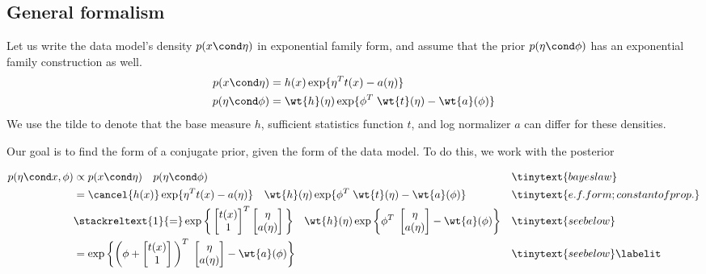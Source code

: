 \documentclass{article} %
\begin{document}
\subsection{General formalism} \label{sec:ef_general_formalism}

Let us write the data model's density $p(x \cond \eta)$ in exponential family form, and assume that the prior $p(\eta \cond \phi)$ has an exponential family construction as well.  
\begin{align*}
p(x \cond \eta) &= h(x) \exp \{\eta^T t(x) - a(\eta)   \}	 \\
p(\eta \cond \phi) &= \wt{h}(\eta) \exp \{\phi^T \; \wt{t}(\eta) - \wt{a}(\phi)   \}	
\end{align*}
We use the tilde to denote that the base measure $h$, sufficient statistics function $t$, and log normalizer $a$ can differ for these densities.  

Our goal is to find the form of a conjugate prior, given the form of the data model.    To do this, we work with the posterior 

\begin{align*}
p(\eta \cond x, \phi) & \propto p(x \cond \eta) \quad p(\eta \cond \phi) && \tinytext{bayes law}  \\
&=  \cancel{h(x)} \exp \{\eta^T t(x) - a(\eta)  \}  \quad \wt{h}(\eta) \exp \{\phi^T \; \wt{t}(\eta) - \wt{a}(\phi)   \}	&& \tinytext{e.f. form; constant of prop.}\\
& \stackreltext{1}{=} \exp \bigg\{
\begin{bmatrix} 
t(x) \\
1 \\
\end{bmatrix}^T
\begin{bmatrix} 
\eta \\
a(\eta)
\end{bmatrix}
\bigg\} \quad 
\wt{h}(\eta) \exp \bigg\{ \phi^T \; \begin{bmatrix} 
\eta \\
a(\eta)
\end{bmatrix} - \wt{a}(\phi)  \bigg\} && \tinytext{see below} \\
&= \exp \bigg\{ \bigg( \phi + \begin{bmatrix} 
t(x) \\
1 \\
\end{bmatrix} \bigg)^T \; \begin{bmatrix} 
\eta \\
a(\eta)
\end{bmatrix} - \wt{a}(\phi)  \bigg\} && \tinytext{see below} 
\labelit \label{eqn:posterior_under_conjugate_prior}\\
\end{align*}
\end{document}
